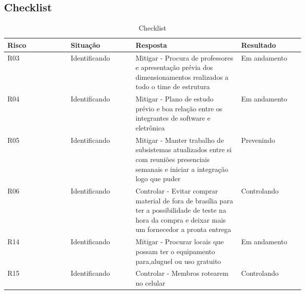 \begin{apendicesenv}
\subsection{Checklist}
\begin{table}[!htp]
    \centering
    \caption{Checklist}
    \label{my-label}
    \begin{tabular}{|p{0.15\linewidth}|p{0.15\linewidth}|p{0.25\linewidth}|p{0.15\linewidth}|}
    \hline
    \textbf{Risco} & \textbf{Situação} & \textbf{Resposta} & \textbf{Resultado} \\ \hline
    R03 & Identificando & Mitigar - Procura de professores e apresentação prévia dos dimensionamentos realizados a todo o time de estrutura & Em andamento \\ \hline
    R04 & Identificando & Mitigar - Plano de estudo prévio e boa relação entre os integrantes de software e eletrônica & Em andamento \\ \hline
    R05 & Identificando & Mitigar - Manter trabalho de subsistemas atualizados entre si com reuniões presenciais semanais e iniciar a integração logo que puder & Prevenindo \\ \hline
    R06 & Identificando & Controlar - Evitar comprar material de fora de brasília para ter a possibilidade de teste na hora da compra e deixar mais um fornecedor a pronta entrega & Controlando \\ \hline
    R14 & Identificando & Mitigar - Procurar locais que possam ter o equipamento para,aluguel ou uso gratuito & Em andamento \\ \hline
    R15 & Identificando & Controlar - Membros rotearem no celular & Controlando \\ \hline
    \end{tabular}
\end{table}

\end{apendicesenv}
